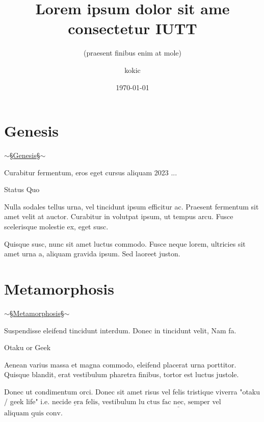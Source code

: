 \documentclass{beamer} %
\title[Lorem ipsum dolor sit ame]{Lorem ipsum dolor sit ame consectetur IUTT}
\subtitle{(praesent finibus enim at mole)}
\author %
{kokic\inst{1}}
\institute[BJYPC] %
{
  \inst{1}%
  Information Science and Technology \\
  Unknown University
}
\date[presentation] %
{\today}
\newcommand{\decoratetext}[1]{\marcellus $\sim$\;\S\quad\underline{#1}\quad\S\;$\sim$}
\begin{document}
 

\frame{\titlepage}

\section{Genesis}
\begin{frame}\begin{center}
{\LARGE\decoratetext{Genesis}}
\vspace{1em}

Curabitur fermentum, eros eget cursus aliquam 2023 ...

\end{center}\end{frame}



\begin{frame}{Status Quo}

\noindent Nulla sodales tellus urna, vel tincidunt ipsum efficitur ac. Praesent fermentum sit amet velit at auctor. Curabitur in volutpat ipsum, ut tempus arcu. Fusce scelerisque molestie ex, eget susc.

Quisque susc, nunc sit amet luctus commodo. Fusce neque lorem, ultricies sit amet urna a, aliquam gravida ipsum. Sed laoreet juston.

\end{frame}


\section{Metamorphosis}
\begin{frame}\begin{center}
{\LARGE\decoratetext{Metamorphosis}}
\vspace{1em}

Suspendisse eleifend tincidunt interdum. Donec in tincidunt velit, Nam fa.
\end{center}\end{frame}




\begin{frame}{Otaku or Geek}

\noindent Aenean varius massa et magna commodo, eleifend placerat urna porttitor. Quisque blandit, erat vestibulum pharetra finibus, tortor est luctus justole.

Donec ut condimentum orci. Donec sit amet risus vel felis tristique viverra "otaku / geek life" i.e. $\underline{\text{necide era felis}}$, vestibulum lu $\underline{\text{ctus fac nec, semper}}$ vel $\underline{\text{aliquam quis conv}}$.

\end{frame}
\end{document}
